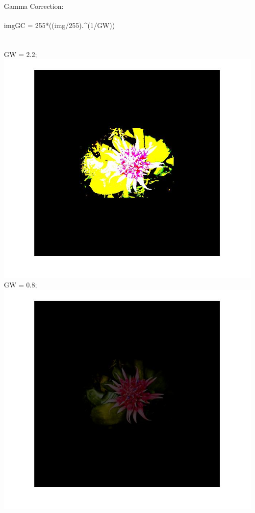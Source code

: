         \\
        Gamma Correction:
        \\\\ imgGC = 255*((img/255).^(1/GW))
        \\\\
        \\ GW = 2.2; \\
        \includegraphics[scale=0.4]{images/SolutionFourth2Part.jpg}
        \\ GW = 0.8; \\
        \includegraphics[scale=0.4]{images/SolutionFourthPart.jpg}
